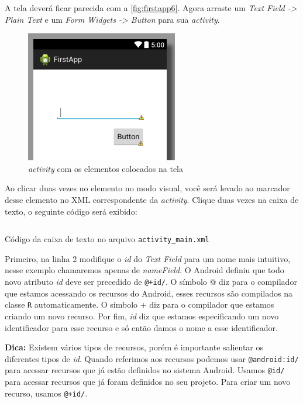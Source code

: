 \documentclass[a4paper,12pt,brazil,oneside]{book}
\begin{document}
A tela deverá ficar parecida com a \autoref{fig:firstapp6}. Agora arraste um \textit{Text Field -> Plain Text} e um \textit{Form Widgets -> Button} para sua \emph{activity}.


\begin{figure}[H]
  \centering
  \includegraphics[width=.4\textwidth]{figuras/firstapp/firstapp7.png}
  \caption{\emph{activity} com os elementos colocados na tela}
  \label{fig:firstapp7}
\end{figure}

Ao clicar duas vezes no elemento no modo visual, você será levado ao marcador desse elemento no XML correspondente da \emph{activity}. Clique duas vezes na caixa de texto, o seguinte código será exibido:

\begin{listing}
\inputminted[linenos=true,fontsize=\small,frame=lines, framesep=2mm, tabsize=2,numbersep=5pt]{xml}{src/firstapp/1.xml}
\caption{Código da caixa de texto no arquivo \texttt{activity\_main.xml}}
\end{listing}

Primeiro, na linha 2 modifique o \emph{id} do \emph{Text Field} para um nome mais intuitivo, nesse exemplo chamaremos apenas de \emph{nameField}. O Android definiu que todo novo atributo \emph{id} deve ser precedido de \texttt{@+id/}. O símbolo @ diz para o compilador que estamos acessando os recursos do Android, esses recursos são compilados na classe \texttt{R} automaticamente. O símbolo + diz para o compilador que estamos criando um novo recurso. Por fim, \emph{id} diz que estamos especificando um novo identificador para esse recurso e só então damos o nome a esse identificador.

\begin{framed}
\textbf{Dica:} Existem vários tipos de recursos, porém é importante salientar os diferentes tipos de \emph{id}. Quando referimos aos recursos podemos usar \texttt{@android:id/} para acessar recursos que já estão definidos no sistema Android. Usamos \texttt{@id/} para acessar recursos que já foram definidos no seu projeto. Para criar um novo recurso, usamos \texttt{@+id/}.
\end{framed}
\end{document}
